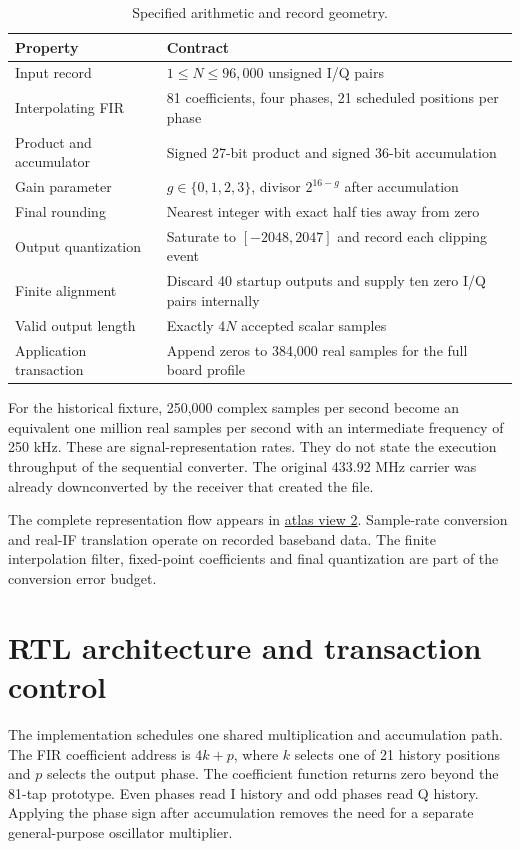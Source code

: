 \documentclass[11pt,letterpaper]{article}
\begin{document}
\begin{table}[H]\centering\small
\caption{Specified arithmetic and record geometry.}
\begin{tabularx}{\linewidth}{@{}p{1.9in}Y@{}}\toprule
Property & Contract \\ \midrule
Input record & $1\leq N\leq96{,}000$ unsigned I/Q pairs \\
Interpolating FIR & 81 coefficients, four phases, 21 scheduled positions per phase \\
Product and accumulator & Signed 27-bit product and signed 36-bit accumulation \\
Gain parameter & $g\in\{0,1,2,3\}$, divisor $2^{16-g}$ after accumulation \\
Final rounding & Nearest integer with exact half ties away from zero \\
Output quantization & Saturate to $[-2048,2047]$ and record each clipping event \\
Finite alignment & Discard 40 startup outputs and supply ten zero I/Q pairs internally \\
Valid output length & Exactly $4N$ accepted scalar samples \\
Application transaction & Append zeros to 384,000 real samples for the full board profile \\
\bottomrule\end{tabularx}
\end{table}

For the historical fixture, 250,000 complex samples per second become an equivalent one million real samples per second with an intermediate frequency of 250 kHz. These are signal-representation rates. They do not state the execution throughput of the sequential converter. The original 433.92 MHz carrier was already downconverted by the receiver that created the file.

\noindent The complete representation flow appears in \href{../../architecture/rf_iq/02-signal-representation.png}{atlas view 2}. Sample-rate conversion and real-IF translation operate on recorded baseband data. The finite interpolation filter, fixed-point coefficients and final quantization are part of the conversion error budget.

\newpage
\section{RTL architecture and transaction control}
The implementation schedules one shared multiplication and accumulation path. The FIR coefficient address is $4k+p$, where $k$ selects one of 21 history positions and $p$ selects the output phase. The coefficient function returns zero beyond the 81-tap prototype. Even phases read I history and odd phases read Q history. Applying the phase sign after accumulation removes the need for a separate general-purpose oscillator multiplier.
\end{document}
